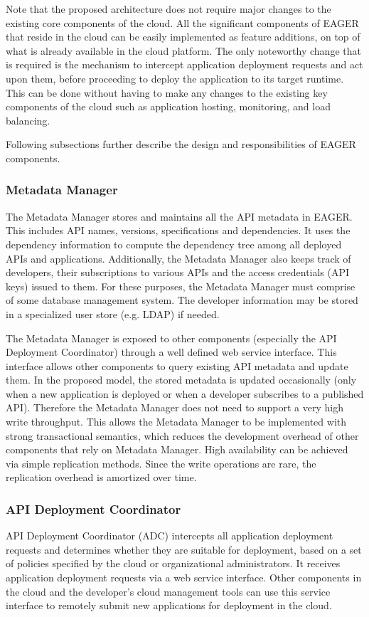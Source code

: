 Note that the proposed architecture does not require major changes to the existing core components of the cloud. All the 
significant components of EAGER that reside in the cloud can be easily implemented as feature additions, on top of what is already available 
in the cloud platform.
The only noteworthy change that is required is the mechanism to intercept application deployment requests and act upon them, before
proceeding to deploy the application to its target runtime. This can be done without having to make any changes to the existing key 
components of the cloud such as application hosting, monitoring, and load balancing.

Following subsections further describe the design and responsibilities of EAGER components.

\subsubsection{Metadata Manager}
The Metadata Manager stores and maintains all the API metadata in EAGER. This includes API names, versions, specifications and dependencies.
It uses the dependency information to compute the dependency tree among all deployed APIs and applications. Additionally, the Metadata Manager
also keeps track of developers, their subscriptions to various APIs and the access credentials (API keys) issued to them. For these purposes,
the Metadata Manager must comprise of some database management system. The developer information may be stored in a specialized user
store (e.g. LDAP) if needed.

The Metadata Manager is exposed to other components (especially the API Deployment Coordinator) through a well defined web service interface.
This interface allows other components to query existing API metadata and update them. In the proposed model, the stored metadata is updated 
occasionally (only when a new application is deployed or when a developer subscribes to a published API). Therefore the Metadata Manager
does not need to support a very high write throughput. This allows the Metadata Manager to be implemented with strong transactional semantics,
which reduces the development overhead of other components that rely on Metadata Manager. High availability can be achieved via
simple replication methods. Since the write operations are rare, the replication overhead is amortized over time.

\subsubsection{API Deployment Coordinator}
API Deployment Coordinator (ADC) intercepts all application deployment requests and determines whether they are suitable for deployment, based
on a set of policies specified by the cloud or organizational administrators. It receives application deployment requests via a web service interface.
Other components in the cloud and the developer's cloud management tools can use this service interface to remotely submit new applications for
deployment in the cloud. 

